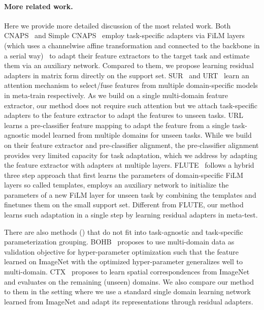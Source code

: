 \paragraph{More related work.} 
Here we provide more detailed discussion of the most related work.
Both CNAPS~\cite{requeima2019fast} and Simple CNAPS~\cite{bateni2020improved} employ task-specific adapters via FiLM layers (which uses a channelwise affine transformation and connected to the backbone in a serial way)~\cite{perez2018film} to adapt their feature extractors to the target task and estimate them via an auxiliary network. 
Compared to them, we propose learning residual adapters in matrix form directly on the support set.
SUR~\cite{dvornik2020selecting} and URT~\cite{liu2020universal} learn an attention mechanism to select/fuse features from multiple domain-specific models in meta-train respectively. 
As we build on a single multi-domain feature extractor, our method does not require such attention but we attach task-specific adapters to the feature extractor to adapt the features to unseen tasks.
URL~\cite{li2021universal} learns a pre-classifier feature mapping to adapt the feature from a single task-agnostic model learned from multiple domains for unseen tasks. 
While we build on their feature extractor and pre-classifier alignment, the pre-classifier alignment provides very limited capacity for task adaptation, which we address by adapting the feature extractor with adapters at multiple layers.
FLUTE~\cite{triantafillou2021flute} follows a hybrid three step approach that first learns the parameters of domain-specific FiLM layers so called templates, employs an auxiliary network to initialize the parameters of a new FiLM layer for unseen task by combining the templates and finetunes them on the small support set.
Different from FLUTE, our method learns such adaptation in a single step by learning residual adapters in meta-test.

There are also methods (\eg \cite{saikia2020optimized,doersch2020crosstransformers}) that do not fit into task-agnostic and task-specific parameterization grouping.
BOHB~\cite{saikia2020optimized} proposes to use multi-domain data as validation objective for hyper-parameter optimization such that the feature learned on ImageNet with the optimized hyper-parameter generalizes well to multi-domain. 
CTX~\cite{doersch2020crosstransformers} proposes to learn spatial correspondences from ImageNet and evaluates on the remaining (unseen) domains.
We also compare our method to them in the setting where we use a standard single domain learning network learned from ImageNet and adapt its representations through residual adapters. 

